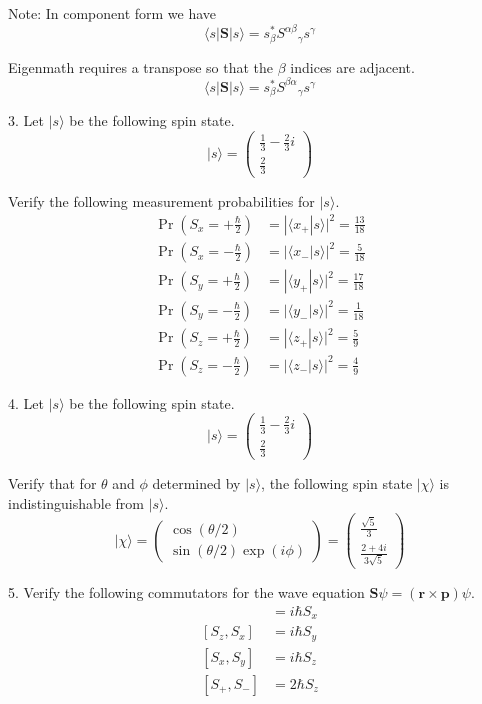 Note: In component form we have
\begin{equation*}
\langle s|\mathbf S|s\rangle
=s_\beta^*{S^{\alpha\beta}}_\gamma s^\gamma
\end{equation*}

Eigenmath requires a transpose so that the $\beta$ indices are adjacent.
\begin{equation*}
\langle s|\mathbf S|s\rangle
=s_\beta^*{S^{\beta\alpha}}_\gamma s^\gamma
\end{equation*}

3. Let $|s\rangle$ be the following spin state.
\begin{equation*}
|s\rangle=\begin{pmatrix}\frac{1}{3}-\frac{2}{3}i\\[1ex]\frac{2}{3}\end{pmatrix}
\end{equation*}

Verify the following measurement probabilities for $|s\rangle$.
\begin{align*}
\Pr\left(S_x=+\tfrac{\hbar}{2}\right)&=|\langle x_+|s\rangle|^2=\tfrac{13}{18}
\\
\Pr\left(S_x=-\tfrac{\hbar}{2}\right)&=|\langle x_-|s\rangle|^2=\tfrac{5}{18}
\\[1ex]
\Pr\left(S_y=+\tfrac{\hbar}{2}\right)&=|\langle y_+|s\rangle|^2=\tfrac{17}{18}
\\
\Pr\left(S_y=-\tfrac{\hbar}{2}\right)&=|\langle y_-|s\rangle|^2=\tfrac{1}{18}
\\[1ex]
\Pr\left(S_z=+\tfrac{\hbar}{2}\right)&=|\langle z_+|s\rangle|^2=\tfrac{5}{9}
\\
\Pr\left(S_z=-\tfrac{\hbar}{2}\right)&=|\langle z_-|s\rangle|^2=\tfrac{4}{9}
\end{align*}

4. Let $|s\rangle$ be the following spin state.
\begin{equation*}
|s\rangle=\begin{pmatrix}\frac{1}{3}-\frac{2}{3}i\\[1ex]\frac{2}{3}\end{pmatrix}
\end{equation*}

Verify that for $\theta$ and $\phi$ determined by $|s\rangle$,
the following spin state $|\chi\rangle$ is indistinguishable from $|s\rangle$.
\begin{equation*}
|\chi\rangle
=\begin{pmatrix}\cos(\theta/2)\\\sin(\theta/2)\exp(i\phi)\end{pmatrix}
=\begin{pmatrix}\frac{\sqrt5}{3}\\[1ex]\frac{2+4i}{3\sqrt5}\end{pmatrix}
\end{equation*}

5. Verify the following commutators for the wave equation
$\mathbf S\psi=(\mathbf r\times\mathbf p)\psi$.
\begin{align*}
[S_y,S_z]&=i\hbar S_x
\\
[S_z,S_x]&=i\hbar S_y
\\
[S_x,S_y]&=i\hbar S_z
\\[1ex]
[S_+,S_-]&=2\hbar S_z
\end{align*}


